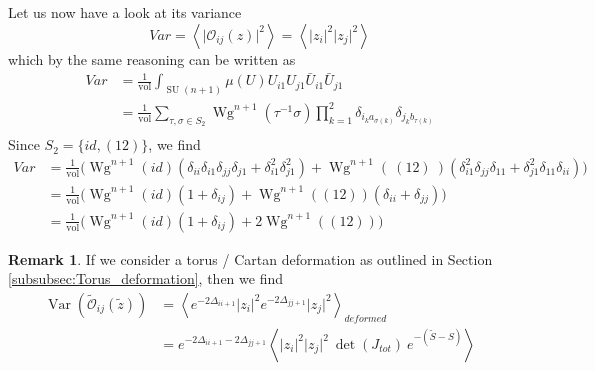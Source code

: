 \documentclass[a4paper,11pt]{article}
\theoremstyle{definition}
\newtheorem{remark}{Remark}
\DeclareMathOperator{\SU}{SU}
\DeclareMathOperator{\Var}{Var}
\DeclareMathOperator{\vol}{vol}
\DeclareMathOperator{\Wg}{Wg}
\newcommand{\OO}{\mathcal O}
\begin{document}
Let us now have a look at its variance
\begin{equation}
  Var = \left\langle \lvert \OO_{ij}(z) \rvert^2  \right\rangle = \left\langle \lvert z_i \rvert^2 \lvert z_j \rvert^2 \right\rangle 
\end{equation}
which by the same reasoning can be written as
\begin{equation}
  \begin{split} 
    Var &= \frac{1}{\vol} \int_{\SU(n+1)} \mu(U) U_{i1}U_{j1}\bar U_{i1} \bar U_{j1} \\
  &= \frac{1}{\vol} \sum_{\tau,\sigma \in S_2} \Wg^{n+1}(\tau^{-1}\sigma) \prod_{k = 1}^2 \delta_{i_k a_{\sigma(k)}}\delta_{j_k b_{\tau(k)}} \\
  \end{split}
\end{equation}
Since $S_2 = \{ id, (12) \}$, we find
\begin{equation}
  \begin{split} 
    Var &= \frac{1}{\vol} \Big( \Wg^{n+1}(id) \left( \delta_{ii}\delta_{i1}\delta_{jj}\delta_{j1} + \delta_{i1}^2 \delta_{j1}^2 \right) +  \Wg^{n+1}(\ (12)\ ) \left( \delta_{i1}^2\delta_{jj}\delta_{11} + \delta_{j1}^2\delta_{11}\delta_{ii} \right)\Big)\\
    &= \frac{1}{\vol} \Big( \Wg^{n+1}(id)(1 + \delta_{ij}) + \Wg^{n+1}((12)) (\delta_{ii} + \delta_{jj}) \Big)\\
    &= \frac{1}{\vol} \Big( \Wg^{n+1}(id)(1 + \delta_{ij}) + 2 \Wg^{n+1}((12)) \Big)
  \end{split}
\end{equation}

\begin{remark}
  If we consider a torus / Cartan deformation as outlined in Section \ref{subsubsec:Torus_deformation}, then we find 
  \begin{equation}
    \begin{split} 
      \Var(\widetilde{\OO}_{ij}(\tilde z)) &= \left\langle e^{-2\Delta_{ii+1}}\lvert z_i \rvert^2 e^{-2\Delta_{jj+1}}\lvert z_j \rvert^2 \right\rangle_{deformed}\\
      &=  e^{-2\Delta_{ii+1} -2\Delta_{jj+1}} \left\langle  \lvert z_i \rvert^2\lvert z_j \rvert^2\ \det(J_{tot})\ e^{-(\tilde S - S)}\right\rangle 
    \end{split}
  \end{equation}
\end{remark}
\end{document}
